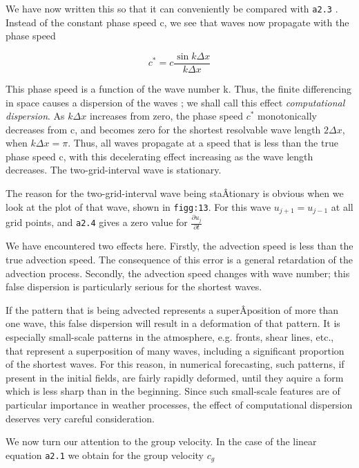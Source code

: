 We have now written this so that it can conveniently be compared with
\texttt{a2.3} . Instead of the constant phase speed c, we see that waves
now propagate with the phase speed

{\[c^{*} = c\frac{\sin{k\Delta x}}{k\Delta x}\]}

This phase speed is a function of the wave number k. Thus, the finite
differencing in space causes a dispersion of the waves ; we shall call
this effect \emph{computational dispersion}. As \(k\Delta x\) increases
from zero, the phase speed \(c^{*}\) monotonically decreases from c, and
becomes zero for the shortest resolvable wave length \(2\Delta x\), when
\(k\Delta x = \pi\). Thus, all waves propagate at a speed that is less
than the true phase speed c, with this decelerating effect increasing as
the wave length decreases. The two-grid-interval wave is stationary.

The reason for the two-grid-interval wave being staÂ­tionary is obvious
when we look at the plot of that wave, shown in \texttt{figg:13}. For
this wave \(u_{j + 1} = u_{j - 1}\) at all grid points, and
\texttt{a2.4} gives a zero value for
\(\frac{{\partial u}_{j}}{\partial t}\)

We have encountered two effects here. Firstly, the advection speed is
less than the true advection speed. The consequence of this error is a
general retardation of the advection process. Secondly, the advection
speed changes with wave number; this false dispersion is particularly
serious for the shortest waves.

\begin{figure}
\centering
{}
\caption{}
\end{figure}

If the pattern that is being advected represents a superÂ­position of
more than one wave, this false dispersion will result in a deformation
of that pattern. It is especially small-scale patterns in the
atmosphere, e.g. fronts, shear lines, etc., that represent a
superposition of many waves, including a significant proportion of the
shortest waves. For this reason, in numerical forecasting, such
patterns, if present in the initial fields, are fairly rapidly deformed,
until they aquire a form which is less sharp than in the beginning.
Since such small-scale features are of particular importance in weather
processes, the effect of computational dispersion deserves very careful
consideration.

We now turn our attention to the group velocity. In the case of the
linear equation \texttt{a2.1} we obtain for the group velocity \(c_{g}\)

